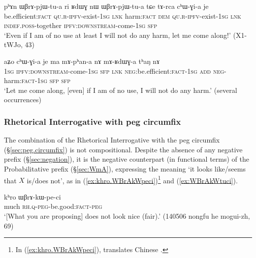  \begin{exe}
\ex \label{ex:WBrApjWtua}
\gll   pʰɤn ɯβrɤ-pjɯ-tu-a ri ʁdɯɣ nɯ ɯβrɤ-pjɯ-tu-a tɕe tɤ-rca cʰɯ-ɣi-a je \\
be.efficient:\textsc{fact} \textsc{qu}.\textsc{r}-\textsc{ipfv}-exist-\textsc{1sg} \textsc{lnk} harm:\textsc{fact} \textsc{dem} \textsc{qu}.\textsc{r}-\textsc{ipfv}-exist-\textsc{1sg}  \textsc{lnk} \textsc{indef}.\textsc{poss}-together \textsc{ipfv}:\textsc{downstream}-come-\textsc{1sg} \textsc{sfp} \\
\glt `Even if I am of no use at least I will not do any harm, let me come along!' (X1-tWJo, 43)
\end{exe}

 \begin{exe}
\ex \label{ex:mAphana.mARdWGa}
\gll  aʑo cʰɯ-ɣi-a je ma mɤ-pʰan-a nɤ mɤ-ʁdɯɣ-a tʰaŋ nɤ \\
\textsc{1sg} \textsc{ipfv}:\textsc{downstream}-come-\textsc{1sg} \textsc{sfp} \textsc{lnk} \textsc{neg}:be.efficient:\textsc{fact}-\textsc{1sg} \textsc{add} \textsc{neg}-harm:\textsc{fact}-\textsc{1sg} \textsc{sfp} \textsc{sfp} \\
\glt `Let me come along, [even] if I am of no use, I will not do any harm.' (several occurrences)
\end{exe}

\subsubsection{Rhetorical Interrogative with peg circumfix} \label{sec:WBrA.kW.ci}
The combination of the Rhetorical Interrogative with the peg circumfix (§\ref{sec:peg.circumfix}) is not compositional. Despite the absence of any negative prefix (§\ref{sec:negation}), it is the negative counterpart (in functional terms) of the Probabilitative prefix (§\ref{sec:WmA}), expressing the meaning `it looks like/seems that $X$ is/does not', as in (\ref{ex:khro.WBrAkWpeci})\footnote{In (\ref{ex:khro.WBrAkWpeci}),  translates Chinese . } and (\ref{ex:WBrAkWtuci}).


\begin{exe}
\ex \label{ex:khro.WBrAkWpeci}
 \gll kʰro ɯβrɤ-kɯ-pe-ci \\
 much \textsc{rh}.\textsc{q}-\textsc{peg}-be.good:\textsc{fact}-\textsc{peg} \\
\glt `[What you are proposing] does not look nice (fair).' (140506 nongfu he mogui-zh, 69)
\end{exe}

